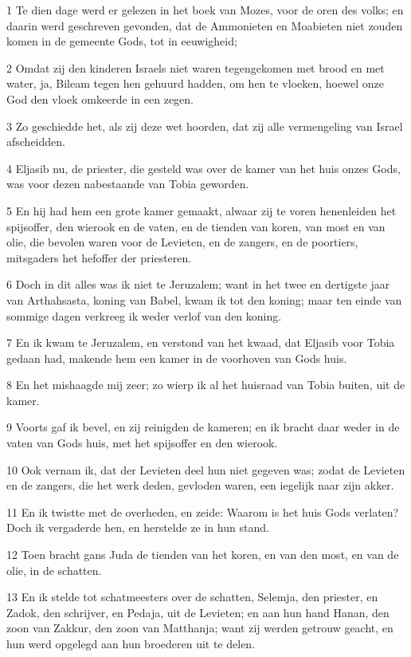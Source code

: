 \par 1 Te dien dage werd er gelezen in het boek van Mozes, voor de oren des volks; en daarin werd geschreven gevonden, dat de Ammonieten en Moabieten niet zouden komen in de gemeente Gods, tot in eeuwigheid;
\par 2 Omdat zij den kinderen Israels niet waren tegengekomen met brood en met water, ja, Bileam tegen hen gehuurd hadden, om hen te vloeken, hoewel onze God den vloek omkeerde in een zegen.
\par 3 Zo geschiedde het, als zij deze wet hoorden, dat zij alle vermengeling van Israel afscheidden.
\par 4 Eljasib nu, de priester, die gesteld was over de kamer van het huis onzes Gods, was voor dezen nabestaande van Tobia geworden.
\par 5 En hij had hem een grote kamer gemaakt, alwaar zij te voren henenleiden het spijsoffer, den wierook en de vaten, en de tienden van koren, van most en van olie, die bevolen waren voor de Levieten, en de zangers, en de poortiers, mitsgaders het hefoffer der priesteren.
\par 6 Doch in dit alles was ik niet te Jeruzalem; want in het twee en dertigste jaar van Arthahsasta, koning van Babel, kwam ik tot den koning; maar ten einde van sommige dagen verkreeg ik weder verlof van den koning.
\par 7 En ik kwam te Jeruzalem, en verstond van het kwaad, dat Eljasib voor Tobia gedaan had, makende hem een kamer in de voorhoven van Gods huis.
\par 8 En het mishaagde mij zeer; zo wierp ik al het huisraad van Tobia buiten, uit de kamer.
\par 9 Voorts gaf ik bevel, en zij reinigden de kameren; en ik bracht daar weder in de vaten van Gods huis, met het spijsoffer en den wierook.
\par 10 Ook vernam ik, dat der Levieten deel hun niet gegeven was; zodat de Levieten en de zangers, die het werk deden, gevloden waren, een iegelijk naar zijn akker.
\par 11 En ik twistte met de overheden, en zeide: Waarom is het huis Gods verlaten? Doch ik vergaderde hen, en herstelde ze in hun stand.
\par 12 Toen bracht gans Juda de tienden van het koren, en van den most, en van de olie, in de schatten.
\par 13 En ik stelde tot schatmeesters over de schatten, Selemja, den priester, en Zadok, den schrijver, en Pedaja, uit de Levieten; en aan hun hand Hanan, den zoon van Zakkur, den zoon van Matthanja; want zij werden getrouw geacht, en hun werd opgelegd aan hun broederen uit te delen.
